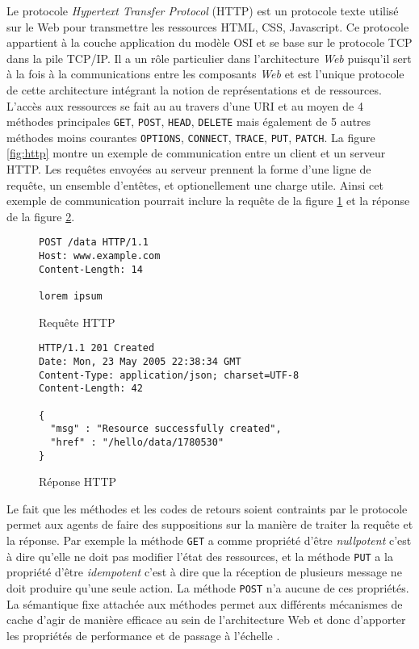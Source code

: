 \documentclass[a4paper, 11pt]{report}
\begin{document}
Le protocole \emph{Hypertext Transfer Protocol} (HTTP) est un
protocole texte utilisé sur le Web pour transmettre les ressources
HTML, CSS, Javascript. Ce protocole appartient à la couche application
du modèle OSI et se base sur le protocole TCP dans la pile TCP/IP. Il
a un rôle particulier dans l'architecture \emph{Web} puisqu'il sert à
la fois à la communications entre les composants \emph{Web} et est
l'unique protocole de cette architecture intégrant la notion de
représentations et de ressources. L'accès aux ressources se fait au au
travers d'une URI et au moyen de 4 méthodes principales \verb=GET=,
\verb=POST=, \verb=HEAD=, \verb=DELETE= mais également de 5 autres
méthodes moins courantes \verb=OPTIONS=, \verb=CONNECT=, \verb=TRACE=,
\verb=PUT=, \verb=PATCH=. La figure \ref{fig:http} montre un exemple
de communication entre un client et un serveur HTTP.  Les requêtes
envoyées au serveur prennent la forme d'une ligne de requête, un
ensemble d'entêtes, et optionellement une charge utile.  Ainsi cet
exemple de communication pourrait inclure la requête de la figure
\ref{fig:httpreq} et la réponse de la figure \ref{fig:httpres}.

\begin{figure}[h]
\begin{verbatim}
POST /data HTTP/1.1
Host: www.example.com
Content-Length: 14

lorem ipsum
\end{verbatim}
\caption{Requête HTTP}
\label{fig:httpreq}
\end{figure}

\begin{figure}[h]
\begin{verbatim}
HTTP/1.1 201 Created
Date: Mon, 23 May 2005 22:38:34 GMT
Content-Type: application/json; charset=UTF-8
Content-Length: 42

{
  "msg" : "Resource successfully created",
  "href" : "/hello/data/1780530"
}
\end{verbatim}
\caption{Réponse HTTP}
\label{fig:httpres}
\end{figure}

Le fait que les méthodes et les codes de retours soient contraints par
le protocole permet aux agents de faire des suppositions sur la
manière de traiter la requête et la réponse. Par exemple la méthode
\verb=GET= a comme propriété d'être \emph{nullpotent} c'est à dire
qu'elle ne doit pas modifier l'état des ressources, et la méthode
\verb=PUT= a la propriété d'être \emph{idempotent} c'est à dire que la
réception de plusieurs message ne doit produire qu'une seule
action. La méthode \verb=POST= n'a aucune de ces propriétés. La
sémantique fixe attachée aux méthodes permet aux différents mécanismes
de cache d'agir de manière efficace au sein de l'architecture Web et
donc d'apporter les propriétés de performance et de passage à
l'échelle \cite{fielding1999hypertext}.
\end{document}

